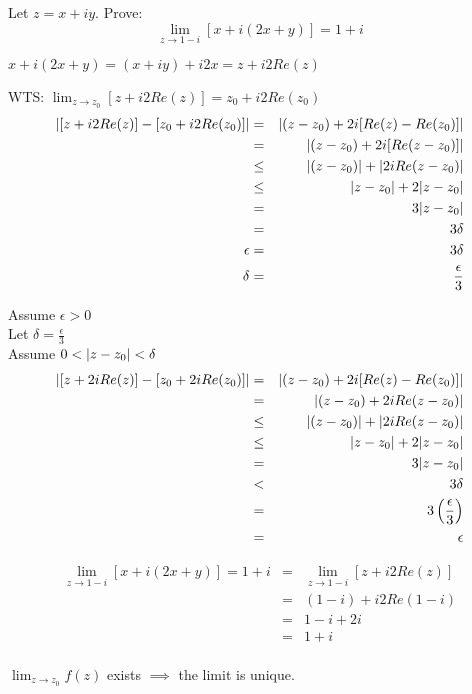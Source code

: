 \documentclass[letterpaper,12pt,fleqn]{article}
\newcommand{\e}{\epsilon}
\renewcommand{\d}{\delta}
\begin{document}
\begin{example}
  Let $z=x+iy$. Prove:
  \[\lim_{z\to 1-i}[x+i(2x+y)]=1+i\]

  $x+i(2x+y)=(x+iy)+i2x=z+i2Re(z)$

  WTS: $\lim_{z\to z_0}[z+i2Re(z)]=z_0+i2Re(z_0)$
  \begin{eqnarray*}
    \abs{[z+i2Re(z)]-[z_0+i2Re(z_0)]} &=& \abs{(z-z_0)+2i[Re(z)-Re(z_0)]} \\
    &=& \abs{(z-z_0)+2i[Re(z-z_0)]} \\
    &\le& \abs{(z-z_0)}+\abs{2iRe(z-z_0)} \\
    &\le& \abs{z-z_0}+2\abs{z-z_0} \\
    &=& 3\abs{z-z_0} \\
    &=& 3\d \\
    \e &=& 3\d \\
    \d &=& \frac{\e}{3} \\
  \end{eqnarray*}

  Assume $\e>0$ \\
  Let $\d=\frac{\e}{3}$ \\
  Assume $0<\abs{z-z_0}<\d$
  \begin{eqnarray*}
    \abs{[z+2iRe(z)]-[z_0+2iRe(z_0)]} &=& \abs{(z-z_0)+2i[Re(z)-Re(z_0)]} \\
    &=& \abs{(z-z_0)+2iRe(z-z_0)} \\
    &\le& \abs{(z-z_0)}+\abs{2iRe(z-z_0)} \\
    &\le& \abs{z-z_0}+2\abs{z-z_0} \\
    &=& 3\abs{z-z_0} \\
    &<& 3\d \\
    &=& 3\left(\frac{\e}{3}\right) \\
    &=& \e \\
  \end{eqnarray*}

  \begin{eqnarray*}
    \lim_{z\to 1-i}[x+i(2x+y)]=1+i &=& \lim_{z\to 1-i}[z+i2Re(z)] \\
    &=& (1-i)+i2Re(1-i) \\
    &=& 1-i+2i \\
    &=& 1+i \\
  \end{eqnarray*}  
\end{example}
\newpage
\begin{theorem}
$\lim_{z\to z_0}f(z)$ exists $\implies$ the limit is unique.
\end{theorem}
\end{document}
